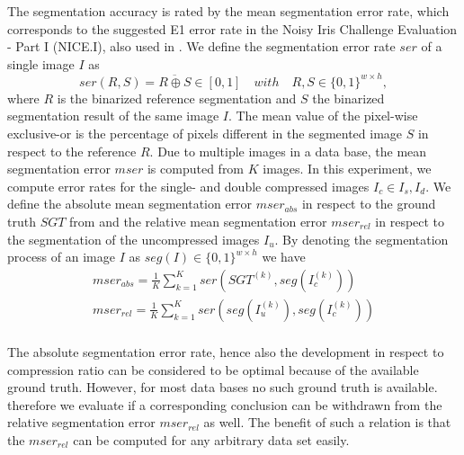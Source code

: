 \documentclass[10pt,twocolumn,letterpaper]{article}
\begin{document}


The segmentation accuracy is rated by the mean segmentation error rate, which corresponds to the suggested E1 error rate in the Noisy Iris Challenge Evaluation - Part I (NICE.I), also used in \cite{severeCompression}. We define the segmentation error rate $ser$ of a single image $I$ as
\begin{equation}
ser(R,S) = \overline{R \oplus S} \in [0,1]\quad with \quad R,S \in \{0,1\}^{w \times h},
\end{equation} where $R$ is the binarized reference segmentation and $S$ the binarized segmentation result of the same image $I$. The mean value of the pixel-wise exclusive-or is the percentage of pixels different in the segmented image $S$ in respect to the reference $R$. Due to multiple images in a data base, the mean segmentation error $mser$ is computed from $K$ images. In this experiment, we compute error rates for the single- and double compressed images $I_c \in {I_s, I_d}$. We define the absolute mean segmentation error $mser_{abs}$ in respect to the ground truth $SGT$ from \cite{severeCompression} and the relative mean segmentation error $mser_{rel}$ in respect to the segmentation of the uncompressed images $I_u$. By denoting the segmentation process of an image $I$ as $seg(I) \in \{0,1\}^{w \times h}$ we have
\begin{eqnarray}
mser_{abs} = \frac{1}{K}\sum_{k=1}^{K}ser(SGT^{(k)},seg(I_c^{(k)})) \label{equ:mserabs} \\
mser_{rel} = \frac{1}{K}\sum_{k=1}^{K}ser(seg(I_u^{(k)}),seg(I_c^{(k)})) \label{equ:mserrel} \\
\end{eqnarray}

The absolute segmentation error rate, hence also the development in respect to compression ratio can be considered to be optimal because of the available ground truth. However, for most data bases no such ground truth is available. therefore we evaluate if a corresponding conclusion can be withdrawn from the relative segmentation error $mser_{rel}$ as well. The benefit of such a relation is that the $mser_{rel}$ can be computed for any arbitrary data set easily. 
\end{document}
